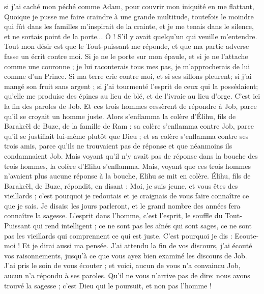 \begin{multicols}{2}
si j'ai caché mon péché comme Adam, pour couvrir mon iniquité en me flattant,
Quoique je pusse me faire craindre à une grande multitude, toutefois le moindre qui fût dans les familles m'inspirait de la crainte, et je me tenais dans le silence, et ne sortais point de la porte...
Ô ! S'il y avait quelqu'un qui veuille m'entendre. Tout mon désir est que le Tout-puissant me réponde, et que ma partie adverse fasse un écrit contre moi.
Si je ne le porte sur mon épaule, et si je ne l'attache comme une couronne ;
je lui raconterais tous mes pas, je m'approcherais de lui comme d'un Prince.
Si ma terre crie contre moi, et si ses sillons pleurent;
si j'ai mangé son fruit sans argent ; si j'ai tourmenté l'esprit de ceux qui la possédaient;
qu'elle me produise des épines au lieu de blé, et de l'ivraie au lieu d'orge. C'est ici la fin des paroles de Job.
\VerseOne{}Et ces trois hommes cessèrent de répondre à Job, parce qu'il se croyait un homme juste. 
Alors s'enflamma la colère d'Élihu, fils de Barakeël de Buze, de la famille de Ram : sa colère s'enflamma contre Job, parce qu'il se justifiait lui-même plutôt que Dieu ; 
et sa colère s'enflamma contre ses trois amis, parce qu'ils ne trouvaient pas de réponse et que néanmoins ils condamnaient Job. 
Mais voyant qu'il n'y avait pas de réponse dans la bouche des trois hommes, la colère d'Elihu s'enflamma.
Mais, voyant que ces trois hommes n'avaient plus aucune réponse à la bouche, Elihu se mit en colère.
Élihu, fils de Barakeël, de Buze, répondit, en disant : Moi, je suis jeune, et vous êtes des vieillards ; c'est pourquoi je redoutais et je craignais de vous faire connaître ce que je sais. 
Je disais: les jours parleront, et le grand nombre des années fera connaître la sagesse.
L'esprit dans l'homme, c'est l'esprit, le souffle du Tout-Puissant qui rend intelligent ;
ce ne sont pas les aînés qui sont sages, ce ne sont pas les vieillards qui comprennent ce qui est juste.
C'est pourquoi je dis : Ecoute-moi ! Et je dirai aussi ma pensée.
J'ai attendu la fin de vos discours, j'ai écouté vos raisonnements, jusqu'à ce que vous ayez bien examiné les discours de Job.
J'ai pris le soin de vous écouter ; et voici, aucun de vous n'a convaincu Job, aucun n'a répondu à ses paroles.
Qu'il ne vous n'arrive pas de dire: nous avons trouvé la sagesse ; c'est Dieu qui le poursuit, et non pas l'homme !

\end{multicols}
